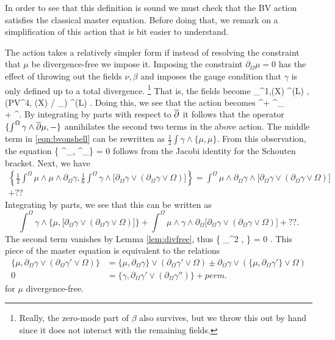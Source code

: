 \documentclass[11pt]{amsart}
\numberwithin{equation}{section}
\def\PV{{\rm PV}}
\def\div{\partial_\Omega}
\begin{document}
In order to see that this definition is sound we must check that the BV action satisfies the classical master equation. 
Before doing that, we remark on a simplification of this action that is bit easier to understand. 

The action takes a relatively simpler form if instead of resolving the constraint that $\mu$ be divergence-free we impose it. 
Imposing the constraint $\div \mu = 0$ has the effect of throwing out the fields $\nu, \beta$ and imposes the gauge condition that $\gamma$ is only defined up to a total divergence. \footnote{Really, the zero-mode part of $\beta$ also survives, but we throw this out by hand since it does not interact with the remaining fields.}
That is, the fields become 
\beqn\label{eqn:bvonshell2}
\mu \in \ker \div \subset \PV^{1,\bu}(X) \; \Hat{\otimes} \;
\Omega^{\bu}(L) , \quad \gamma \in \left(\PV^{4,\bu} (X) / \div \right) \; \Hat{\otimes} \;
\Omega^{\bu}(L) .
\eeqn
Doing this, we see that the action becomes 
\beqn\label{eqn:bvonshell2}
\int^\Omega \gamma \wedge \dbar \mu +  \int^\Omega \mu \wedge \mu \wedge \div \gamma \\ 
+  \int^\Omega \gamma \wedge \big[\div \gamma \vee (\div \gamma \vee \Omega) \big] .
\eeqn
By integrating by parts with respect to $\overline{\partial}$ it follows that the operator $\{\int^\Omega \gamma \wedge \overline{\partial} \mu, -\}$ annihilates the second two terms in the above action. 
The middle term in \eqref{eqn:bvonshell} can be rewritten as $\frac12 \int \gamma \wedge \{\mu, \mu\}$. 
From this observation, the equation 
\beqn\label{eqn:cmeos1}
\left\{ \int^\Omega \mu \wedge \mu \wedge \div \gamma,  \int^\Omega \mu \wedge \mu \wedge \div \gamma \right\} = 0
\eeqn
follows from the Jacobi identity for the Schouten bracket. 
Next, we have
\begin{multline}
\left\{\frac12 \int^\Omega \mu \wedge \mu \wedge \div \gamma, \frac16 \int^\Omega \gamma \wedge \big[\div \gamma \vee (\div \gamma \vee \Omega) \big] \right\} = \int^\Omega \mu \wedge \div \gamma \wedge \big[\div \gamma \vee (\div \gamma \vee \Omega) \big] \\ + ??
\end{multline}
Integrating by parts, we see that this can be written as
\[ 
\int^\Omega \gamma \wedge \{\mu, \big[\div \gamma \vee (\div \gamma \vee \Omega) \big]\} + \int^\Omega \mu \wedge \gamma \wedge \div \big[\div \gamma \vee (\div \gamma \vee \Omega) \big] + ?? .
\]
The second term vanishes by Lemma \ref{lem:divfree}, thus 
\beqn\label{eqn:cmeos2}
\left\{ \int \div \gamma \mu^2 ,  \int \gamma [\div \gamma \vee (\div \gamma \vee \Omega)]\right\} = 0 .
\eeqn
This piece of the master equation is equivalent to the relations
\begin{align*}
\{\mu, \div \gamma \vee (\div \gamma' \vee \Omega)\} & = \{\mu, \div \gamma\} \vee (\div \gamma' \vee \Omega) \pm \div \gamma \vee (\{\mu, \div \gamma'\} \vee \Omega) \\
0 & = \{\gamma, \div \gamma' \vee (\div \gamma'')\} + perm .
\end{align*}
for $\mu$ divergence-free. 
\end{document}
